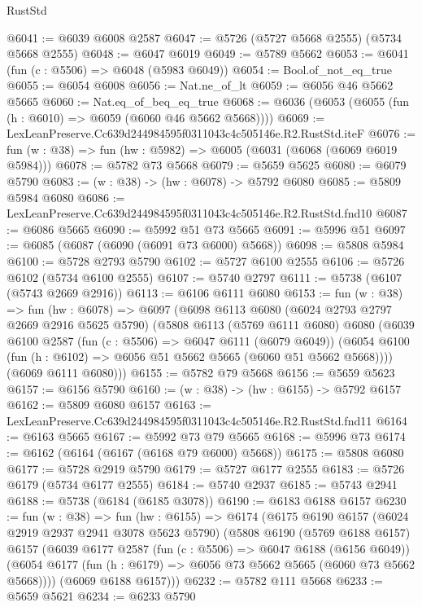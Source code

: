 \begin{lexlean}{RustStd}
\begin{coremodule}
@6041 := @6039 @6008 @2587
@6047 := @5726 (@5727 @5668 @2555) (@5734 @5668 @2555)
@6048 := @6047 @6019
@6049 := @5789 @5662
@6053 := @6041 (fun (c : @5506) => @6048 (@5983 @6049))
@6054 := Bool.of_not_eq_true
@6055 := @6054 @6008
@6056 := Nat.ne_of_lt
@6059 := @6056 @46 @5662 @5665
@6060 := Nat.eq_of_beq_eq_true
@6068 := @6036 (@6053 (@6055 (fun (h : @6010) => @6059 (@6060 @46 @5662 @5668))))
@6069 := LexLeanPreserve.Cc639d244984595f0311043c4c505146e.R2.RustStd.iteF
@6076 := fun (w : @38) => fun (hw : @5982) => @6005 (@6031 (@6068 (@6069 @6019 @5984)))
@6078 := @5782 @73 @5668
@6079 := @5659 @5625
@6080 := @6079 @5790
@6083 := (w : @38) -> (hw : @6078) -> @5792 @6080
@6085 := @5809 @5984 @6080
@6086 := LexLeanPreserve.Cc639d244984595f0311043c4c505146e.R2.RustStd.fnd10
@6087 := @6086 @5665
@6090 := @5992 @51 @73 @5665
@6091 := @5996 @51
@6097 := @6085 (@6087 (@6090 (@6091 @73 @6000) @5668))
@6098 := @5808 @5984
@6100 := @5728 @2793 @5790
@6102 := @5727 @6100 @2555
@6106 := @5726 @6102 (@5734 @6100 @2555)
@6107 := @5740 @2797
@6111 := @5738 (@6107 (@5743 @2669 @2916))
@6113 := @6106 @6111 @6080
@6153 := fun (w : @38) =>
  fun (hw : @6078) =>
  @6097
    (@6098
      @6113
      @6080
      (@6024 @2793 @2797 @2669 @2916 @5625 @5790)
      (@5808
        @6113
        (@5769 @6111 @6080)
        @6080
        (@6039
          @6100
          @2587
          (fun (c : @5506) => @6047 @6111 (@6079 @6049))
          (@6054 @6100 (fun (h : @6102) => @6056 @51 @5662 @5665 (@6060 @51 @5662 @5668))))
        (@6069 @6111 @6080)))
@6155 := @5782 @79 @5668
@6156 := @5659 @5623
@6157 := @6156 @5790
@6160 := (w : @38) -> (hw : @6155) -> @5792 @6157
@6162 := @5809 @6080 @6157
@6163 := LexLeanPreserve.Cc639d244984595f0311043c4c505146e.R2.RustStd.fnd11
@6164 := @6163 @5665
@6167 := @5992 @73 @79 @5665
@6168 := @5996 @73
@6174 := @6162 (@6164 (@6167 (@6168 @79 @6000) @5668))
@6175 := @5808 @6080
@6177 := @5728 @2919 @5790
@6179 := @5727 @6177 @2555
@6183 := @5726 @6179 (@5734 @6177 @2555)
@6184 := @5740 @2937
@6185 := @5743 @2941
@6188 := @5738 (@6184 (@6185 @3078))
@6190 := @6183 @6188 @6157
@6230 := fun (w : @38) =>
  fun (hw : @6155) =>
  @6174
    (@6175
      @6190
      @6157
      (@6024 @2919 @2937 @2941 @3078 @5623 @5790)
      (@5808
        @6190
        (@5769 @6188 @6157)
        @6157
        (@6039
          @6177
          @2587
          (fun (c : @5506) => @6047 @6188 (@6156 @6049))
          (@6054 @6177 (fun (h : @6179) => @6056 @73 @5662 @5665 (@6060 @73 @5662 @5668))))
        (@6069 @6188 @6157)))
@6232 := @5782 @111 @5668
@6233 := @5659 @5621
@6234 := @6233 @5790

\end{coremodule}
\end{lexlean}
